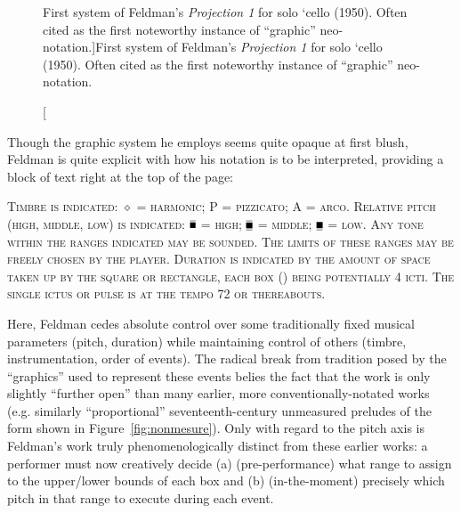         \begin{figure}
            \centering
            \captionsetup{width=.5\textwidth}
            \caption[First system of Feldman's \textit{Projection 1} for solo `cello (1950). Often cited as the first noteworthy instance of ``graphic'' neo-notation.]{First system of Feldman's \textit{Projection 1} for solo `cello (1950). Often cited as the first noteworthy instance of ``graphic'' neo-notation.\footnotemark}
            \label{fig:feldman1}
        \end{figure}

    Though the graphic system he employs seems quite opaque at first blush, Feldman is quite explicit with how his notation is to be interpreted, providing a block of text right at the top of the page:

        \begin{smallquote}
            \textsc{Timbre is indicated: $\diamond$ = harmonic; P = pizzicato; A = arco. Relative pitch (high, middle, low) is indicated: $\overline{\rule{1.2ex}{1.2ex}}$ = high; $\overline{\underline{\rule{1.2ex}{1.2ex}}}$ = middle; $\underline{\rule{1.2ex}{1.2ex}}$ = low. Any tone within the ranges indicated may be sounded. The limits of these ranges may be freely chosen by the player. Duration is indicated by the amount of space taken up by the square or rectangle, each box (\myline[dashed]  \myline[dashed]) being potentially 4 icti. The single ictus or pulse is at the tempo 72 or thereabouts.\autocite{Feldman_2002}}
        \end{smallquote}

    Here, Feldman cedes absolute control over some traditionally fixed musical parameters (pitch, duration) while maintaining control of others (timbre, instrumentation, order of events). The radical break from tradition posed by the ``graphics'' used to represent these events belies the fact that the work is only slightly ``further open'' than many earlier, more conventionally-notated works (e.g. similarly ``proportional'' seventeenth-century unmeasured preludes of the form shown in Figure~\ref{fig:nonmesure}). Only with regard to the pitch axis is Feldman's work truly phenomenologically distinct from these earlier works: a performer must now creatively decide (a) (pre-performance) what range to assign to the upper/lower bounds of each box and (b) (in-the-moment) precisely which pitch in that range to execute during each event.

